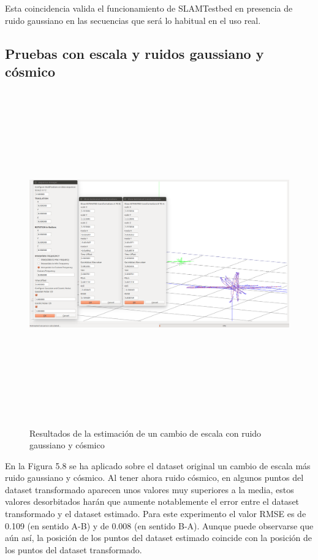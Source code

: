 Esta coincidencia valida el funcionamiento de SLAMTestbed en presencia de ruido gaussiano en las secuencias que será lo habitual en el uso real.

\subsection{Pruebas con escala y ruidos gaussiano y cósmico}
\begin{figure}[H]
\begin{center}
\label{fig:opciones de View}\includegraphics[height=14.0cm,width=18.0cm]{img/cap6/Escala_GaussCosmicNoise_abba.png}
\hspace{0.5cm}

\end{center}

\caption{Resultados de la estimación de un cambio de escala con ruido gaussiano y cósmico}
\end{figure}

En la Figura 5.8 se ha aplicado sobre el dataset original un cambio de escala más ruido gaussiano y cósmico. Al tener ahora ruido cósmico, en algunos puntos del dataset transformado aparecen unos valores muy superiores a la media, estos valores desorbitados harán que aumente notablemente el error entre el dataset transformado y el dataset estimado.
Para este experimento el valor RMSE es de 0.109 (en sentido A-B) y de 0.008 (en sentido B-A). Aunque puede observarse que aún así, la posición de los puntos del dataset estimado coincide con la posición de los puntos del dataset transformado.



